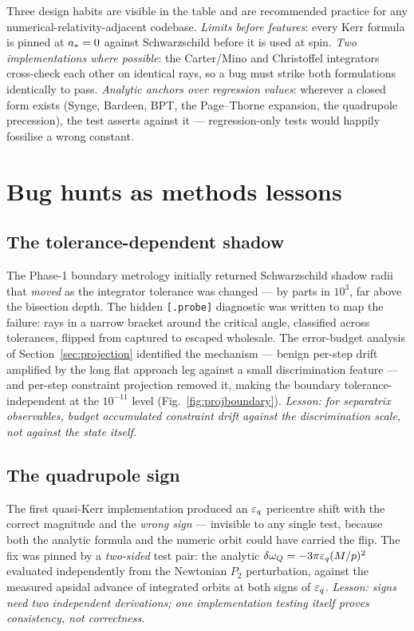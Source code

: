Three design habits are visible in the table and are recommended
practice for any numerical-relativity-adjacent codebase. \emph{Limits
before features}: every Kerr formula is pinned at $a_* = 0$ against
Schwarzschild before it is used at spin. \emph{Two implementations
where possible}: the Carter/Mino and Christoffel integrators cross-check
each other on identical rays, so a bug must strike both formulations
identically to pass. \emph{Analytic anchors over regression values}:
wherever a closed form exists (Synge, Bardeen, BPT, the Page--Thorne
expansion, the quadrupole precession), the test asserts against it —
regression-only tests would happily fossilise a wrong constant.

\section{Bug hunts as methods lessons}
\label{sec:bughunts}

\subsection{The tolerance-dependent shadow}
The Phase-1 boundary metrology initially returned Schwarzschild shadow
radii that \emph{moved} as the integrator tolerance was changed —
by parts in $10^3$, far above the bisection depth. The hidden
\texttt{[.probe]} diagnostic was written to map the failure: rays in a
narrow bracket around the critical angle, classified across tolerances,
flipped from captured to escaped wholesale. The error-budget analysis of
Section~\ref{sec:projection} identified the mechanism — benign
per-step drift amplified by the long flat approach leg against a small
discrimination feature — and per-step constraint projection removed it,
making the boundary tolerance-independent at the $10^{-11}$ level
(Fig.~\ref{fig:projboundary}). \emph{Lesson: for separatrix
observables, budget accumulated constraint drift against the
discrimination scale, not against the state itself.}

\subsection{The quadrupole sign}
The first quasi-Kerr implementation produced an $\varepsilon_q$ pericentre
shift with the correct magnitude and the \emph{wrong sign} — invisible
to any single test, because both the analytic formula and the numeric
orbit could have carried the flip. The fix was pinned by a
\emph{two-sided} test pair: the analytic
$\delta\omega_Q = -3\pi\varepsilon_q(M/p)^2$ evaluated independently from the
Newtonian $P_2$ perturbation, against the measured apsidal advance of
integrated orbits at both signs of $\varepsilon_q$. \emph{Lesson: signs need
two independent derivations; one implementation testing itself proves
consistency, not correctness.}

